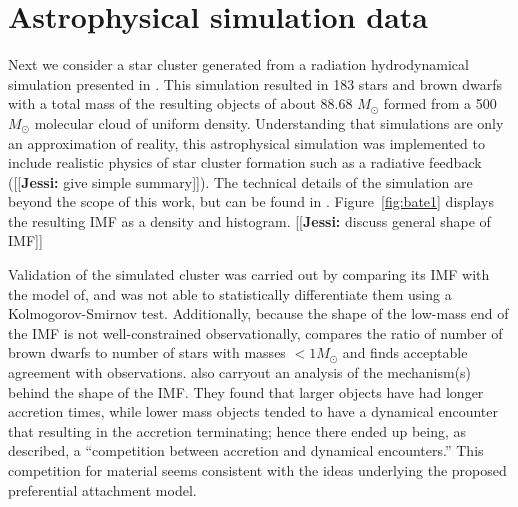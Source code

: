 \documentclass[12pt]{article}
\newcommand{\jessi}[1]{{\color{blue}[[\textbf{Jessi: }#1]]}}
\newcommand{\Msun}{M_{\odot}}
\begin{document}
\section{Astrophysical simulation data} \label{sec:bate}

Next we consider a star cluster generated from a radiation hydrodynamical simulation presented in \cite{Bate2012}.  This simulation resulted in 183 stars and brown dwarfs with a total mass of the resulting objects of about 88.68 $\Msun$ formed from a 500 $\Msun$ molecular cloud of uniform density.  
Understanding that simulations are only an approximation of reality, this astrophysical simulation was implemented to include realistic physics of star cluster formation such as a radiative feedback (\jessi{give simple summary}). 
The technical details of the simulation are beyond the scope of this work, but can be found in \cite{Bate2012}.
Figure~\ref{fig:bate1} displays the resulting IMF as a density and histogram. \jessi{discuss general shape of IMF}
%

Validation of the simulated cluster was carried out by comparing its IMF with the model of\cite{chabrier2005}, and was not able to statistically differentiate them using a Kolmogorov-Smirnov test.  
%
Additionally, because the shape of the low-mass end of the IMF is not well-constrained observationally,  \cite{Bate2012} compares the ratio of number of brown dwarfs to number of stars with masses $<1\Msun$ and finds acceptable agreement with observations. 
%
\cite{Bate2012} also carryout an analysis of the mechanism(s) behind the shape of the IMF.  
They found that larger objects have had longer accretion times, while lower mass objects tended to have a dynamical encounter that resulting in the accretion terminating; hence there ended up being, as \cite{Bate2012} described, a ``competition between accretion and dynamical encounters.''  This competition for material seems consistent with the ideas underlying the proposed preferential attachment model.
\end{document}
